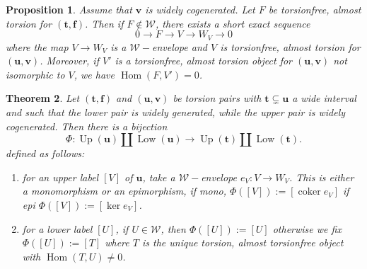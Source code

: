 \documentclass[11pt]{amsart}
\newtheorem{theorem}{Theorem}[section]
\newtheorem{proposition}[theorem]{Proposition}
\theoremstyle{definition}
\newcommand{\coker}{\operatorname{coker}}
\newcommand{\Hom}{\operatorname{Hom}}
\newcommand{\Up}{\operatorname{Up}}
\newcommand{\Low}{\operatorname{Low}}
\newcommand{\tpair}[2]{(\mathbf{#1}, \mathbf{#2})  }
\begin{document}
\begin{proposition}
\label{prop:upper-exchange-dual}
Assume that \(\mathbf v\) is widely cogenerated. Let \(F\)  be torsionfree, almost torsion for \(\tpair{t}{f}\). Then if \( F \not \in \mathcal{W} \), there exists a short exact sequence
\[
0 \to F \to V \to W_V \to 0 
\]
where the map \( V \to W_V \) is a \( \mathcal{W}-\)envelope and \( V \) is torsionfree, almost torsion for \( \tpair{u}{v} \). Moreover, if \( V' \) is a torsionfree, almost torsion object for \( \tpair{u}{v} \) not isomorphic to \( V \), we have \( \Hom(F, V') = 0 \).
\end{proposition}

\begin{theorem}
\label{thm:full-mutation-labels}
Let \( \tpair{t}{f} \) and \( \tpair{u}{v} \) be torsion pairs with \( \mathbf{t} \subsetneq \mathbf{u} \) a wide interval and such that the lower pair is widely generated, while the upper pair is widely cogenerated.
Then there is a bijection
\[
\Phi : \Up(\mathbf u)\coprod \Low(\mathbf u) \to \Up(\mathbf t)\coprod \Low(\mathbf t).
\]
defined as follows:
\begin{enumerate}
\item for an upper label $ [V] $ of $ \mathbf{u} $, take a $ \mathcal{W}-$envelope $ e_V : V \to W_V $. This is either a monomorphism or an epimorphism, if mono, $ \Phi([V]) := [\coker e_V] $ if epi $ \Phi([V]) := [\ker e_V] $.
\item for a lower label $ [U] $, if $ U \in \mathcal{W} $, then $ \Phi([U]) := [U] $ otherwise we fix $ \Phi([U]) := [T] $ where $ T $ is the unique torsion, almost torsionfree object with \( \Hom(T, U) \ne 0 \).
\end{enumerate}
\end{theorem}
\end{document}
